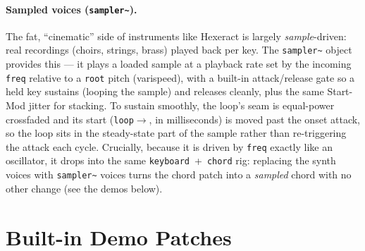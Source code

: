\documentclass[11pt,letterpaper]{article}
\begin{document}
\paragraph{Sampled voices (\texttt{sampler\~{}}).} The fat, ``cinematic'' side of instruments
like Hexeract is largely \emph{sample}-driven: real recordings (choirs, strings, brass) played
back per key. The \texttt{sampler\~{}} object provides this --- it plays a loaded sample at a
playback rate set by the incoming \texttt{freq} relative to a \texttt{root} pitch
(varispeed), with a built-in attack/release gate so a held key sustains (looping the sample) and
releases cleanly, plus the same Start-Mod jitter for stacking. To sustain smoothly, the loop's
seam is equal-power crossfaded and its start (\texttt{loop\ensuremath{\rightarrow}}, in
milliseconds) is moved past the onset attack, so the loop sits in the steady-state part of the
sample rather than re-triggering the attack each cycle. Crucially, because it is driven by
\texttt{freq} exactly like an oscillator, it drops into the same \texttt{keyboard}~+~\texttt{chord}
rig: replacing the synth voices with \texttt{sampler\~{}} voices turns the chord patch into a
\emph{sampled} chord with no other change (see the demos below).

\section{Built-in Demo Patches}
\end{document}
